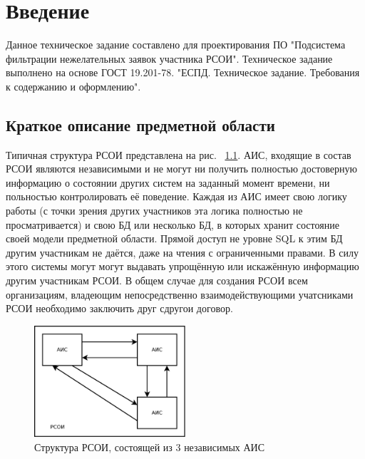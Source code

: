 \documentclass[utf8x, 12pt]{G7-32}
\begin{document}
\mainmatter

\chapter{Введение}
Данное техническое задание составлено для проектирования ПО "Подсистема 
фильтрации нежелательных заявок участника РСОИ". Техническое задание выполнено на 
основе ГОСТ 19.201-78. "ЕСПД. Техническое задание. Требования к содержанию и 
оформлению".

\section{Краткое описание предметной области}
Типичная структура РСОИ представлена на рис. ~\ref{fig:rsoi}. АИС, входящие в 
состав РСОИ  являются независимыми и не могут ни получить полностью достоверную 
информацию о состоянии других систем на заданный момент времени, ни польностью 
контролировать её поведение. Каждая из АИС имеет свою логику работы (с точки 
зрения других участников эта логика полностью не просматривается) и свою БД 
или несколько БД, в которых хранит состояние своей модели предметной области. 
Прямой доступ не уровне SQL к этим БД другим участникам не даётся, даже на чтения 
с ограниченными правами. В силу этого системы могут могут выдавать упрощённую или 
искажённую информацию другим участникам РСОИ. В общем случае для создания 
РСОИ всем организациям, владеющим непосредственно взаимодействующими 
учатсниками РСОИ необходимо заключить друг сдругои договор.
\begin{figure}
        \centering
        \includegraphics[width=0.5\textwidth]{inc/dia/rpz-rsoi}
        \caption{Структура РСОИ, состоящей из 3 независимых АИС}
        \label{fig:rsoi}
\end{figure}
\end{document}
